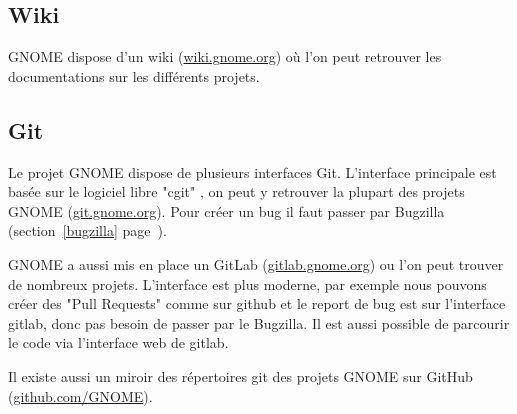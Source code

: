 \documentclass[12pt]{report}
\begin{document}

\subsection{Wiki}
\label{wiki}
GNOME dispose d'un wiki (\href{https://wiki.gnome.org/}{wiki.gnome.org})
où l'on peut retrouver les documentations sur les différents projets.

\subsection{Git}
\label{git}

\label{cgit}
Le projet GNOME dispose de plusieurs interfaces Git. L'interface 
principale est basée sur le logiciel libre "cgit"
, on peut y retrouver la plupart des projets GNOME 
(\href{https://git.gnome.org/}{git.gnome.org}). Pour créer un bug il faut
passer par Bugzilla (section~\ref{bugzilla} page~\pageref{bugzilla}).

\label{gitlab}
GNOME a aussi mis en place un GitLab (\href{https://gitlab.gnome.org/GNOME}
{gitlab.gnome.org}) ou l'on peut trouver de nombreux projets. L'interface
est plus moderne, par exemple nous pouvons créer des "Pull Requests" comme
sur github et le report de bug est sur l'interface gitlab, donc pas besoin
de passer par le Bugzilla. Il est aussi possible de parcourir le code via
l'interface web de gitlab.

\label{github}
Il existe aussi un miroir des répertoires git des projets GNOME sur GitHub 
(\href{https://github.com/GNOME}{github.com/GNOME}).
\end{document}
